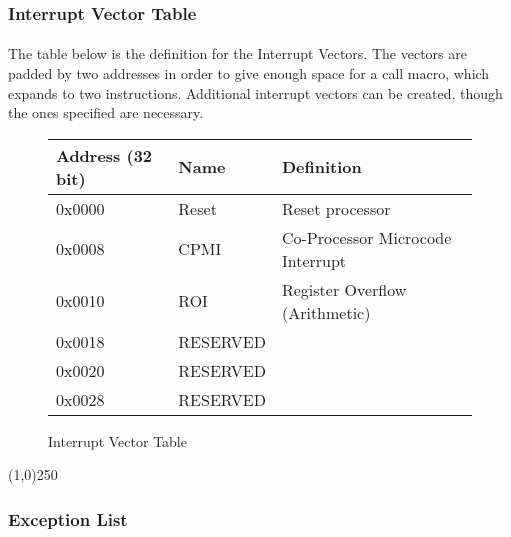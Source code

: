 \documentclass[letterpaper, 11pt]{article}
\begin{document}
\subsubsection{Interrupt Vector Table}
\paragraph{} The table below is the definition for the Interrupt Vectors. The vectors are padded by two addresses
in order to give enough space for a call macro, which expands to two instructions. Additional interrupt vectors 
can be created, though the ones specified are necessary.

\begin{figure}[!h]
	\begin{center}
		\begin{tabular}{|l|l|l|}
			\hline
			Address (32 bit) 	& Name  & Definition						\\  \hline
			0x0000 				& Reset & Reset processor					\\ 	\hline
			0x0008 				& CPMI  & Co-Processor Microcode Interrupt 	\\ 	\hline
			0x0010 				& ROI	& Register Overflow (Arithmetic)	\\ 	\hline
			0x0018				&  RESERVED&\\ 	\hline
			0x0020 				& RESERVED &\\ 	\hline
			0x0028 				& RESERVED &\\	\hline
		\end{tabular} 
		\caption{Interrupt Vector Table}
	\end{center}
	
\end{figure} 

\begin{center}
	\line(1,0){250}
\end{center}

\subsubsection{Exception List}
\end{document}
